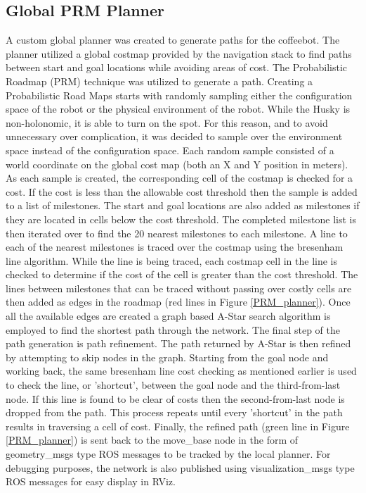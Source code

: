 \documentclass[letterpaper, 10 pt, conference]{ieeeconf}  %
\begin{document}
\subsection{Global PRM Planner}

A custom global planner was created to generate paths for the coffeebot. The planner utilized a global costmap provided by the navigation stack to find paths between start and goal locations while avoiding areas of cost. The Probabilistic Roadmap (PRM) technique was utilized to generate a path. Creating a Probabilistic Road Maps starts with randomly sampling either the configuration space of the robot or the physical environment of the robot. While the Husky is non-holonomic, it is able to turn on the spot. For this reason, and to avoid unnecessary over complication, it was decided to sample over the environment space instead of the configuration space. Each random sample consisted of a world coordinate on the global cost map (both an X and Y position in meters). As each sample is created, the corresponding cell of the costmap is checked for a cost. If the cost is less than the allowable cost threshold then the sample is added to a list of milestones. The start and goal locations are also added as milestones if they are located in cells below the cost threshold. The completed milestone list is then iterated over to find the 20 nearest milestones to each milestone. A line to each of the nearest milestones is traced over the costmap using the bresenham line algorithm. While the line is being traced, each costmap cell in the line is checked to determine if the cost of the cell is greater than the cost threshold. The lines between milestones that can be traced without passing over costly cells are then added as edges in the roadmap (red lines in Figure \ref{PRM_planner}). Once all the available edges are created a graph based A-Star search algorithm is employed to find the shortest path through the network. The final step of the path generation is path refinement. The path returned by A-Star is then refined by attempting to skip nodes in the graph. Starting from the goal node and working back, the same bresenham line cost checking as mentioned earlier is used to check the line, or 'shortcut', between the goal node and the third-from-last node. If this line is found to be clear of costs then the second-from-last node is dropped from the path. This process repeats until every 'shortcut' in the path results in traversing a cell of cost.
Finally, the refined path (green line in Figure \ref{PRM_planner}) is sent back to the move\_base node in the form of geometry\_msgs type ROS messages to be tracked by the local planner. For debugging purposes, the network is also published using visualization\_msgs type ROS messages for easy display in RViz. 
\end{document}
